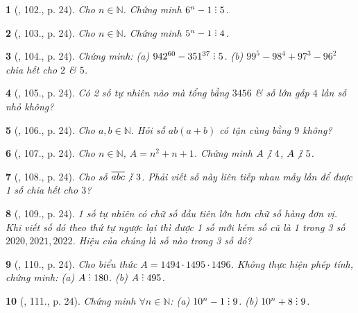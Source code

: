 \documentclass{article}
\newtheorem{baitoan}{}
\DeclareRobustCommand{\divby}{%
	\mathrel{\vbox{\baselineskip.65ex\lineskiplimit0pt\hbox{.}\hbox{.}\hbox{.}}}%
}
\begin{document}
\begin{baitoan}[\cite{Tuyen_Toan_6}, 102., p. 24]
	Cho $n\in\mathbb{N}$. Chứng minh $6^n - 1\divby5$.
\end{baitoan}

\begin{baitoan}[\cite{Tuyen_Toan_6}, 103., p. 24]
	Cho $n\in\mathbb{N}$. Chứng minh $5^n - 1\divby4$.
\end{baitoan}

\begin{baitoan}[\cite{Tuyen_Toan_6}, 104., p. 24]
	Chứng minh: (a) $942^{60} - 351^{37}\divby5$. (b) $99^5 - 98^4 + 97^3 - 96^2$ chia hết cho $2$ \& $5$.
\end{baitoan}

\begin{baitoan}[\cite{Tuyen_Toan_6}, 105., p. 24]
	Có 2 số tự nhiên nào mà tổng bằng $3456$ \& số lớn gấp $4$ lần số nhỏ không?
\end{baitoan}

\begin{baitoan}[\cite{Tuyen_Toan_6}, 106., p. 24]
	Cho $a,b\in\mathbb{N}$. Hỏi số $ab(a + b)$ có tận cùng bằng $9$ không?
\end{baitoan}

\begin{baitoan}[\cite{Tuyen_Toan_6}, 107., p. 24]
	Cho $n\in\mathbb{N}$, $A = n^2 + n + 1$. Chứng minh $A\not{\divby}\ 4$, $A\not{\divby}\ 5$.
\end{baitoan}

\begin{baitoan}[\cite{Tuyen_Toan_6}, 108., p. 24]
	Cho số $\overline{abc}\not{\divby}\ 3$. Phải viết số này liên tiếp nhau mấy lần để được 1 số chia hết cho $3$?
\end{baitoan}

\begin{baitoan}[\cite{Tuyen_Toan_6}, 109., p. 24]
	1 số tự nhiên có chữ số đầu tiên lớn hơn chữ số hàng đơn vị. Khi viết số đó theo thứ tự ngược lại thì được 1 số mới kém số cũ là 1 trong 3 số $2020,2021,2022$. Hiệu của chúng là số nào trong 3 số đó?
\end{baitoan}

\begin{baitoan}[\cite{Tuyen_Toan_6}, 110., p. 24]
	Cho biểu thức $A = 1494\cdot1495\cdot1496$. Không thực hiện phép tính, chứng minh: (a) $A\divby180$. (b) $A\divby495$.
\end{baitoan}

\begin{baitoan}[\cite{Tuyen_Toan_6}, 111., p. 24]
	Chứng minh $\forall n\in\mathbb{N}$: (a) $10^n - 1\divby9$. (b) $10^n + 8\divby9$.
\end{baitoan}
\end{document}
